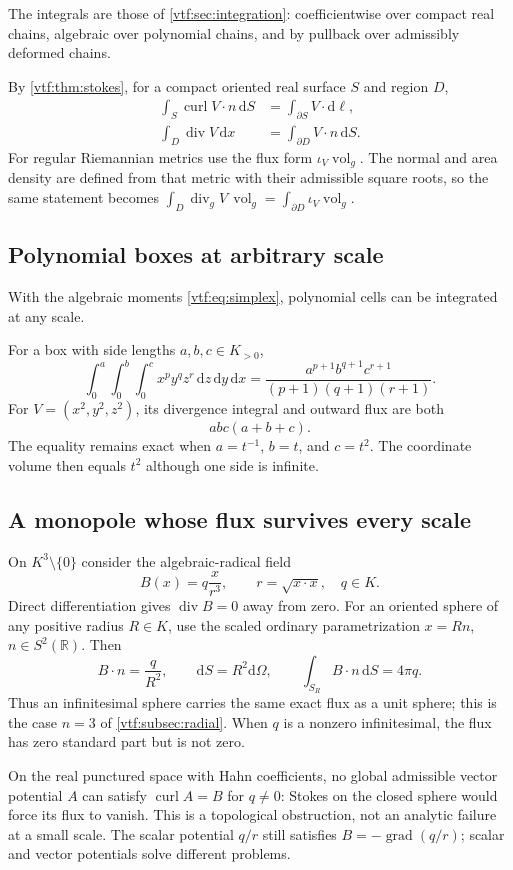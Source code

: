 \documentclass[11pt,letterpaper]{article}
\theoremstyle{definition}
\theoremstyle{remark}
\newcommand{\R}{\mathbb R}\newcommand{\C}{\mathbb C}
\newcommand{\grad}{\operatorname{grad}}\newcommand{\Div}{\operatorname{div}}
\newcommand{\curl}{\operatorname{curl}}
\newcommand{\vol}{\operatorname{vol}}\newcommand{\GL}{\operatorname{GL}}
\newcommand{\dd}{\mathrm d}
\begin{document}
The integrals are those of \cref{vtf:sec:integration}: coefficientwise over
compact real chains, algebraic over polynomial chains, and by pullback over
admissibly deformed chains.

By \cref{vtf:thm:stokes}, for a compact oriented real surface $S$ and region $D$,
\begin{align}
 \int_S\curl V\cdot n\,\dd S&=\int_{\partial S}V\cdot\dd\ell,\\
 \int_D\Div V\,\dd x&=\int_{\partial D}V\cdot n\,\dd S.
\end{align}
For regular Riemannian metrics use the flux form $\iota_V\vol_g$. The normal and area density are defined from that metric with their admissible square roots, so the same statement becomes
$\int_D\Div_gV\,\vol_g=\int_{\partial D}\iota_V\vol_g$.

\subsection{Polynomial boxes at arbitrary scale}

With the algebraic moments \eqref{vtf:eq:simplex}, polynomial cells can be
integrated at any scale.

For a box with side lengths $a,b,c\in K_{>0}$,
\[
 \int_0^a\int_0^b\int_0^c
 x^py^qz^r\,\dd z\,\dd y\,\dd x
 =\frac{a^{p+1}b^{q+1}c^{r+1}}{(p+1)(q+1)(r+1)}.
\]
For $V=(x^2,y^2,z^2)$, its divergence integral and outward flux are both
\[
 abc(a+b+c).
\]
The equality remains exact when $a=t^{-1}$, $b=t$, and $c=t^2$. The coordinate volume then equals $t^2$ although one side is infinite.

\subsection{A monopole whose flux survives every scale}\label{vtf:3d:subsec:monopole}
On $K^3\setminus\{0\}$ consider the algebraic-radical field
\[
 B(x)=q\frac{x}{r^3},\qquad r=\sqrt{x\cdot x},\quad q\in K.
\]
Direct differentiation gives $\Div B=0$ away from zero. For an oriented sphere of any positive radius $R\in K$, use the scaled ordinary parametrization $x=Rn$, $n\in S^2(\R)$. Then
\[
 B\cdot n=\frac q{R^2},\qquad \dd S=R^2\dd\Omega,
 \qquad \int_{S_R}B\cdot n\,\dd S=4\pi q.
\]
Thus an infinitesimal sphere carries the same exact flux as a unit sphere; this
is the case $n=3$ of \cref{vtf:subsec:radial}. When $q$ is a nonzero infinitesimal, the flux has zero standard part but is not zero.

On the real punctured space with Hahn coefficients, no global admissible vector potential $A$ can satisfy $\curl A=B$ for $q\ne0$: Stokes on the closed sphere would force its flux to vanish. This is a topological obstruction, not an analytic failure at a small scale. The scalar potential $q/r$ still satisfies $B=-\grad(q/r)$; scalar and vector potentials solve different problems.
\end{document}
